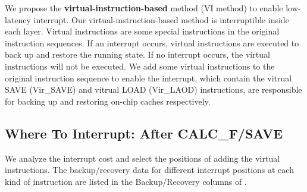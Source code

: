 
We propose the \textbf{virtual-instruction-based} method (VI method) to enable low-latency interrupt. 
Our virtual-instruction-based method is interruptible inside each layer. 
Virtual instructions are some special instructions in the original instruction sequences.
If an interrupt occurs, virtual instructions are executed to back up and restore the running state.
If no interrupt occurs, the virtual instructions will not be executed.
We add some virtual instructions to the original instruction sequence to enable the interrupt, which contain the vitrual SAVE (Vir\_SAVE) and vitrual LOAD  (Vir\_LAOD) instructions, are responsible for backing up and restoring on-chip caches respectively. 




\subsection{ Where To Interrupt: After CALC\_F/SAVE }
\label{sec:whereinter}
We analyze the interrupt cost and select the positions of adding the virtual instructions.
The backup/recovery data for different interrupt positions at each kind of instruction are listed in the Backup/Recovery columns of .

